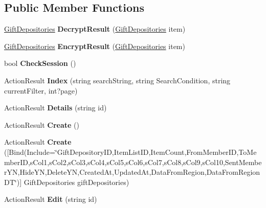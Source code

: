 \subsection*{Public Member Functions}
\begin{DoxyCompactItemize}
\item 
\hyperlink{a00086}{Gift\+Depositories} {\bfseries Decrypt\+Result} (\hyperlink{a00086}{Gift\+Depositories} item)\hypertarget{a00087_a19a4ed752e8df39fef5d7021427d9dbf}{}\label{a00087_a19a4ed752e8df39fef5d7021427d9dbf}

\item 
\hyperlink{a00086}{Gift\+Depositories} {\bfseries Encrypt\+Result} (\hyperlink{a00086}{Gift\+Depositories} item)\hypertarget{a00087_ad13e8ee4dfa8debf7385d288f1a9c189}{}\label{a00087_ad13e8ee4dfa8debf7385d288f1a9c189}

\item 
bool {\bfseries Check\+Session} ()\hypertarget{a00087_ac83d65a549bd88ca67100b6c279f25c9}{}\label{a00087_ac83d65a549bd88ca67100b6c279f25c9}

\item 
Action\+Result {\bfseries Index} (string search\+String, string Search\+Condition, string current\+Filter, int?page)\hypertarget{a00087_a7b24a6befd1e8d18f61e0db027631729}{}\label{a00087_a7b24a6befd1e8d18f61e0db027631729}

\item 
Action\+Result {\bfseries Details} (string id)\hypertarget{a00087_aa4bbcf592c6168a7ec2f34ad956042bf}{}\label{a00087_aa4bbcf592c6168a7ec2f34ad956042bf}

\item 
Action\+Result {\bfseries Create} ()\hypertarget{a00087_afc99e05312f28141718d0f4660221e4c}{}\label{a00087_afc99e05312f28141718d0f4660221e4c}

\item 
Action\+Result {\bfseries Create} (\mbox{[}Bind(Include=\char`\"{}Gift\+Depository\+ID,Item\+List\+ID,Item\+Count,From\+Member\+ID,To\+Member\+ID,s\+Col1,s\+Col2,s\+Col3,s\+Col4,s\+Col5,s\+Col6,s\+Col7,s\+Col8,s\+Col9,s\+Col10,Sent\+Member\+YN,Hide\+YN,Delete\+YN,Created\+At,Updated\+At,Data\+From\+Region,Data\+From\+Region\+DT\char`\"{})\mbox{]} Gift\+Depositories gift\+Depositories)\hypertarget{a00087_aa35ddc32a96e9cb8dfb4a4b504e1944f}{}\label{a00087_aa35ddc32a96e9cb8dfb4a4b504e1944f}

\item 
Action\+Result {\bfseries Edit} (string id)\hypertarget{a00087_a3f65c373166f83a28de97d61991256eb}{}\label{a00087_a3f65c373166f83a28de97d61991256eb}


\end{DoxyCompactItemize}
